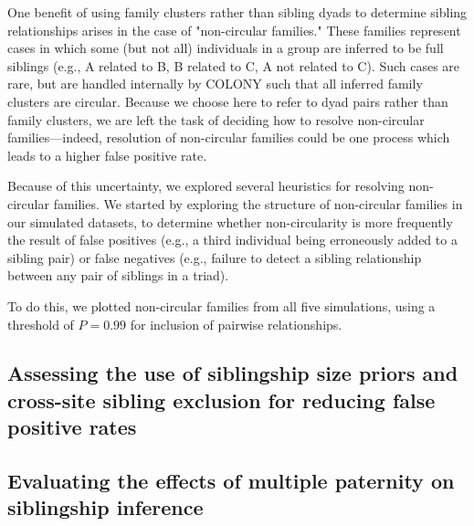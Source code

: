 \documentclass[12pt]{article}
\begin{document}
One benefit of using family clusters rather than sibling dyads to determine sibling relationships arises in the case of "non-circular families." These families represent cases in which some (but not all) individuals in a group are inferred to be full siblings (e.g., A related to B, B related to C, A not related to C). Such cases are rare, but are handled internally by COLONY such that all inferred family clusters are circular. Because we choose here to refer to dyad pairs rather than family clusters, we are left the task of deciding how to resolve non-circular families---indeed, resolution of non-circular families could be one process which leads to a higher false positive rate.

Because of this uncertainty, we explored several heuristics for resolving non-circular families. We started by exploring the structure of non-circular families in our simulated datasets, to determine whether non-circularity is more frequently the result of false positives (e.g., a third individual being erroneously added to a sibling pair) or false negatives (e.g., failure to detect a sibling relationship between any pair of siblings in a triad).

To do this, we plotted non-circular families from all five simulations, using a threshold of $P = 0.99$ for inclusion of pairwise relationships.




\subsection{Assessing the use of siblingship size priors and cross-site sibling exclusion for reducing false positive rates}

\subsection{Evaluating the effects of multiple paternity on siblingship inference}
\end{document}
